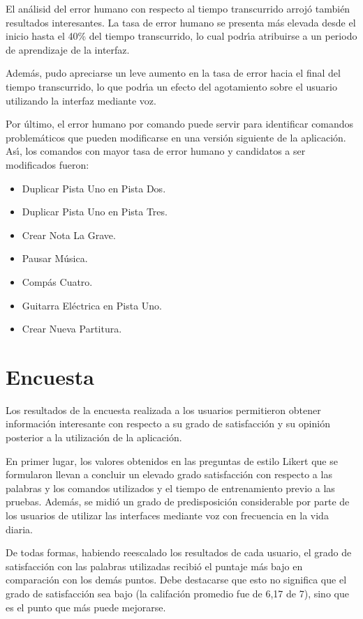 El an\'alisid del error humano con respecto al tiempo transcurrido arroj\'o tambi\'en
resultados interesantes. La tasa de error humano se presenta m\'as elevada desde el inicio hasta
el 40\% del tiempo transcurrido, lo cual podr{\'\i}a atribuirse a un periodo de aprendizaje
de la interfaz.

Adem\'as, pudo apreciarse un leve aumento en la tasa de error hacia el final del tiempo
transcurrido, lo que podr{\'\i}a un efecto del agotamiento sobre el usuario utilizando la
interfaz mediante voz.

Por \'ultimo, el error humano por comando puede servir para identificar comandos 
problem\'aticos que pueden modificarse en una versi\'on siguiente de la aplicaci\'on.
As{\'\i}, los comandos con mayor tasa de error humano y candidatos a ser modificados fueron:

\begin{itemize}
	\item Duplicar Pista Uno en Pista Dos.
	\item Duplicar Pista Uno en Pista Tres.
	\item Crear Nota La Grave.
	\item Pausar M\'usica.
	\item Comp\'as Cuatro.
	\item Guitarra El\'ectrica en Pista Uno.
	\item Crear Nueva Partitura.
\end{itemize}

\section{Encuesta}
Los resultados de la encuesta realizada a los usuarios permitieron obtener informaci\'on
interesante con respecto a su grado de satisfacci\'on y su opini\'on posterior a la utilizaci\'on
de la aplicaci\'on.

En primer lugar, los valores obtenidos en las preguntas de estilo Likert que se formularon
llevan a concluir un elevado grado satisfacci\'on con respecto a las palabras y los comandos
utilizados y el tiempo de entrenamiento previo a las pruebas.
Adem\'as, se midi\'o un grado de predisposici\'on considerable por parte de los usuarios de utilizar
las interfaces mediante voz con frecuencia en la vida diaria.

De todas formas, habiendo reescalado los resultados de cada usuario, el grado de satisfacci\'on
con las palabras utilizadas recibi\'o el puntaje m\'as bajo en comparaci\'on con los dem\'as puntos.
Debe destacarse que esto no significa que el grado de satisfacci\'on sea bajo (la califaci\'on promedio
fue de 6,17 de 7), sino que es el punto que m\'as puede mejorarse.

